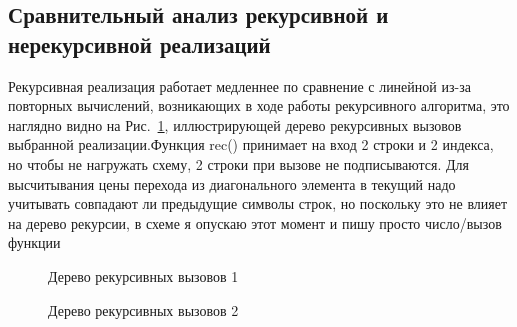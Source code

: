 \documentclass[a4paper, 14pt]{article}
\begin{document}
\newpage
	\subsection{Сравнительный анализ рекурсивной и нерекурсивной реализаций}
	Рекурсивная реализация работает медленнее по сравнение с линейной из-за повторных вычислений, возникающих в ходе работы рекурсивного алгоритма, это наглядно видно на Рис.~\ref{ris:mpr1}, иллюстрирующей дерево рекурсивных вызовов выбранной реализации.Функция rec() принимает на вход 2 строки и 2 индекса, но чтобы не нагружать схему, 2 строки при вызове не подписываются. Для высчитывания цены перехода из диагонального элемента в текущий надо учитывать совпадают ли предыдущие символы строк, но поскольку это не влияет на дерево рекурсии, в схеме я опускаю этот момент и пишу просто число/вызов функции\\
	
	
\begin{figure}[th!]
\caption{Дерево рекурсивных вызовов 1}
\label{ris:mpr1}
\end{figure}

\begin{figure}[pth!]
\caption{Дерево рекурсивных вызовов 2}
\label{ris:mpr2}
\end{figure}
\end{document}
